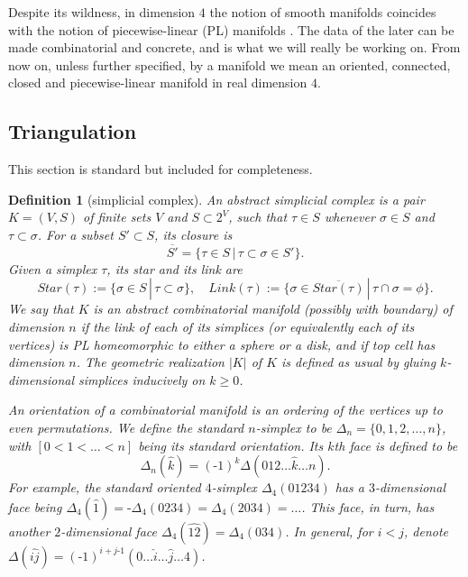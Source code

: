 \documentclass[12pt]{extarticle}
\numberwithin{equation}{section} %
\theoremstyle{mystyle}
\newtheorem{definition}[equation]{Definition}
\begin{document}
\noindent Despite its wildness, in dimension $4$ the notion of
smooth manifolds coincides with the notion of piecewise-linear
(PL) manifolds \cite[sec.IX.1.1]{turaev-qiok-3-manifolds}. The
data of the later can be made combinatorial and concrete, and is
what we will really be working on. From now on, unless further
specified, by a manifold we mean an oriented, connected, closed
and piecewise-linear manifold in real dimension $4$.

\subsection{Triangulation} \label{subsection/triangulation}

This section is standard
\cite[chap.1]{rourke-sanderson/intro-to-pl-topology}
\cite[sec.2]{manolescu/lectures-on-the-triangulation-conjecture}
but included for completeness.

\begin{definition}[simplicial complex]\label{def/simplicial-complex}
  An abstract simplicial complex is a pair $K = (V, S)$ of finite
  sets $V$ and $S \subset 2^{V}$, such that $\tau \in S$ whenever
  $\sigma \in S$ and $\tau \subset \sigma$. For a subset
  $S' \subset S$, its closure is
  $$\overline{S'} = \{\tau \in S \,|\, \tau \subset \sigma \in S'\}.$$
  Given a simplex $\tau$, its star and its link are
  $$Star(\tau) := \{\sigma \in S \,|\, \tau \subset \sigma\}, \quad
  Link(\tau) := \{\sigma \in \overline{Star(\tau)} \,|\, \tau \cap \sigma = \phi\}.$$
  We say that $K$ is an abstract combinatorial manifold (possibly
  with boundary) of dimension $n$ if the link of each of its
  simplices (or equivalently each of its vertices) is PL
  homeomorphic to either a sphere or a disk, and if top cell has
  dimension $n$. The geometric realization $|K|$ of $K$ is
  defined as usual by gluing $k$-dimensional simplices inducively
  on $k \geq 0$.

  An orientation of a combinatorial manifold is an ordering of
  the vertices up to even permutations. We define the standard
  $n$-simplex to be $\Delta_{n} = \{0, 1, 2, \ldots, n\}$, with
  $[0 < 1 < \ldots < n]$ being its standard orientation. Its
  $k$th face is defined to be
  $$\Delta_{n}(\widehat{k}) = (\text{-} 1)^{k}\Delta(012 \ldots \widehat{k} \ldots n).$$
  For example, the standard oriented $4$-simplex
  $\Delta_{4}(01234)$ has a $3$-dimensional face being
  $\Delta_{4}(\widehat{1}) = \text{-} \Delta_{4}(0234) = \Delta_{4}(2034) = \ldots$.
  This face, in turn, has another $2$-dimensional face
  $\Delta_{4}(\widehat{12}) = \Delta_{4}(034)$. In general, for
  $i<j$, denote
  $\Delta(\widehat{ij}) = (\text{-} 1)^{i+j \text{-} 1}(0 \ldots \widehat{i} \ldots \widehat{j} \ldots 4)$.
\end{definition}
\end{document}
